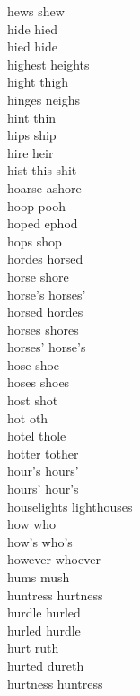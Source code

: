 hews shew\\
hide hied\\
hied hide\\
highest heights\\
hight thigh\\
hinges neighs\\
hint thin\\
hips ship\\
hire heir\\
hist this shit\\
hoarse ashore\\
hoop pooh\\
hoped ephod\\
hops shop\\
hordes horsed\\
horse shore\\
horse's horses'\\
horsed hordes\\
horses shores\\
horses' horse's\\
hose shoe\\
hoses shoes\\
host shot\\
hot oth\\
hotel thole\\
hotter tother\\
hour's hours'\\
hours' hour's\\
houselights lighthouses\\
how who\\
how's who's\\
however whoever\\
hums mush\\
huntress hurtness\\
hurdle hurled\\
hurled hurdle\\
hurt ruth\\
hurted dureth\\
hurtness huntress\\

